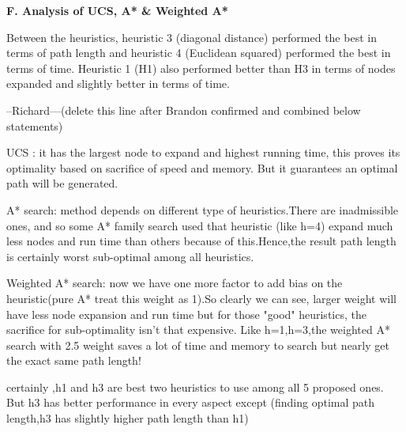 \documentclass[12pt, letterpaper]{article}
\begin{document}
\noindent \textbf{F. Analysis of UCS, A* \& Weighted A*}

Between the heuristics, heuristic 3 (diagonal distance) performed the best in terms of path length and heuristic 4 (Euclidean squared) performed the best in terms of time. Heuristic 1 (H1) also performed better than H3 in terms of nodes expanded and slightly better in terms of time. 

--Richard---(delete this line after Brandon confirmed and combined below statements)\newline

UCS : it has the largest node to expand and highest running time, this proves its optimality based on sacrifice of speed and memory. But it guarantees an optimal path will be generated.\newline

A* search: method depends on different type of heuristics.There are inadmissible ones, and so some A* family search used that heuristic (like h=4) expand much less nodes and run time than others because of this.Hence,the result path length is certainly worst sub-optimal among all heuristics.\newline

Weighted A* search: now we have one more factor to add bias on the heuristic(pure A* treat this weight as 1).So clearly we can see, larger weight will have less node expansion and run time but for those "good" heuristics, the sacrifice for sub-optimality isn't that expensive. Like h=1,h=3,the weighted A* search with 2.5 weight saves a lot of time and memory to search but nearly get the exact same path length!\newline

certainly ,h1 and h3 are best two heuristics to use among all 5 proposed ones. But h3 has better performance in every aspect except (finding optimal path length,h3 has slightly higher path length than h1)
\end{document}
